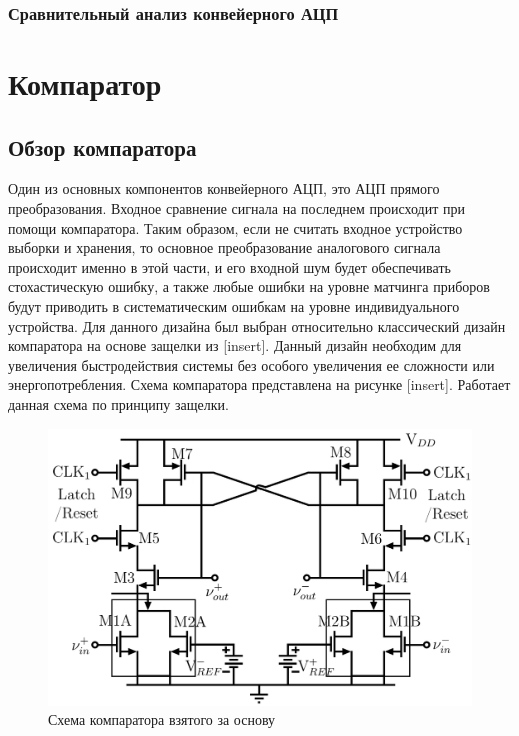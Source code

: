 \documentclass[a4paper,12pt]{article} %
\begin{document}
\subsubsection{Сравнительный анализ конвейерного АЦП }


\section{Компаратор}

\subsection{Обзор компаратора}

Один из основных компонентов конвейерного АЦП, это АЦП прямого преобразования. Входное сравнение сигнала на последнем происходит при помощи компаратора. Таким образом, если не считать входное устройство выборки и хранения, то основное преобразование аналогового сигнала происходит именно в этой части, и его входной шум будет обеспечивать стохастическую ошибку, а также любые ошибки на уровне матчинга приборов будут приводить в систематическим ошибкам на уровне индивидуального устройства.
Для данного дизайна был выбран относительно классический дизайн компаратора на основе защелки из [insert]. Данный дизайн необходим для увеличения быстродействия системы без особого увеличения ее сложности или энергопотребления. Схема компаратора представлена на рисунке [insert]. Работает данная схема по принципу защелки.



\begin{figure}[H]
    \includegraphics[width=\textwidth]{pre_comparator.png}
    \caption{Схема компаратора взятого за основу}
    \label{pic:pre_comparator}
\end{figure}
\end{document}
